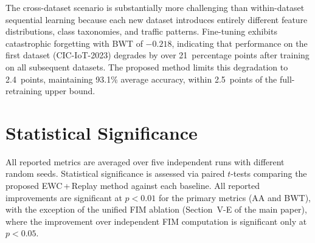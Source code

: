 \documentclass[journal]{IEEEtran}
\begin{document}
The cross-dataset scenario is substantially more challenging than within-dataset sequential learning because each new dataset introduces entirely different feature distributions, class taxonomies, and traffic patterns. Fine-tuning exhibits catastrophic forgetting with BWT of $-0.218$, indicating that performance on the first dataset (CIC-IoT-2023) degrades by over 21~percentage points after training on all subsequent datasets. The proposed method limits this degradation to 2.4~points, maintaining 93.1\% average accuracy, within 2.5~points of the full-retraining upper bound.

\section{Statistical Significance}

All reported metrics are averaged over five independent runs with different random seeds. Statistical significance is assessed via paired $t$-tests comparing the proposed EWC\,+\,Replay method against each baseline. All reported improvements are significant at $p < 0.01$ for the primary metrics (AA and BWT), with the exception of the unified FIM ablation (Section~V-E of the main paper), where the improvement over independent FIM computation is significant only at $p < 0.05$.
\end{document}

